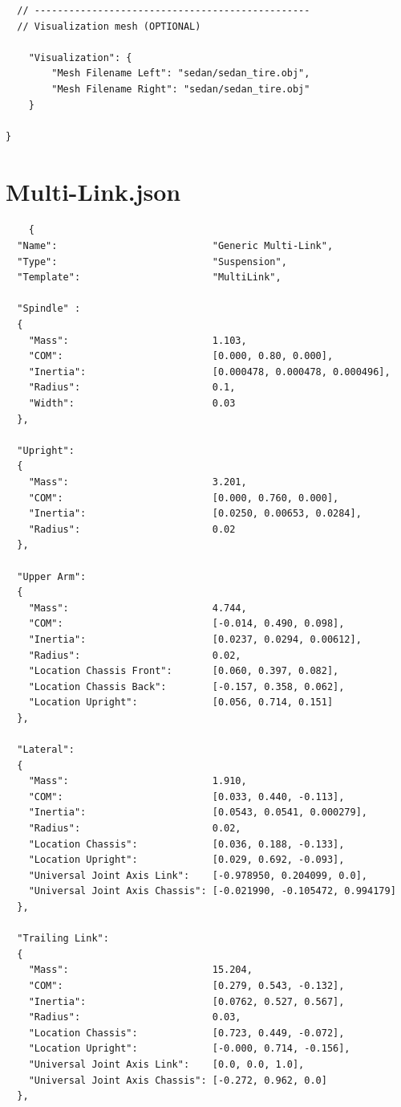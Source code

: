 \begin{lstlisting}
  // ------------------------------------------------
  // Visualization mesh (OPTIONAL)

    "Visualization": {
        "Mesh Filename Left": "sedan/sedan_tire.obj",
        "Mesh Filename Right": "sedan/sedan_tire.obj"
    }

}
\end{lstlisting}

\section{Multi-Link.json}
\begin{lstlisting}
    {
  "Name":                           "Generic Multi-Link",
  "Type":                           "Suspension",
  "Template":                       "MultiLink",

  "Spindle" :
  {
    "Mass":                         1.103,
    "COM":                          [0.000, 0.80, 0.000],
    "Inertia":                      [0.000478, 0.000478, 0.000496],
    "Radius":                       0.1,
    "Width":                        0.03
  },

  "Upright":
  {
    "Mass":                         3.201,
    "COM":                          [0.000, 0.760, 0.000],
    "Inertia":                      [0.0250, 0.00653, 0.0284],
    "Radius":                       0.02
  },

  "Upper Arm":
  {
    "Mass":                         4.744,
    "COM":                          [-0.014, 0.490, 0.098],
    "Inertia":                      [0.0237, 0.0294, 0.00612],
    "Radius":                       0.02,
    "Location Chassis Front":       [0.060, 0.397, 0.082],
    "Location Chassis Back":        [-0.157, 0.358, 0.062],
    "Location Upright":             [0.056, 0.714, 0.151]
  },

  "Lateral":
  {
    "Mass":                         1.910,
    "COM":                          [0.033, 0.440, -0.113],
    "Inertia":                      [0.0543, 0.0541, 0.000279],
    "Radius":                       0.02,
    "Location Chassis":             [0.036, 0.188, -0.133],
    "Location Upright":             [0.029, 0.692, -0.093],
    "Universal Joint Axis Link":    [-0.978950, 0.204099, 0.0],
    "Universal Joint Axis Chassis": [-0.021990, -0.105472, 0.994179]
  },

  "Trailing Link":
  {
    "Mass":                         15.204,
    "COM":                          [0.279, 0.543, -0.132],
    "Inertia":                      [0.0762, 0.527, 0.567],
    "Radius":                       0.03,
    "Location Chassis":             [0.723, 0.449, -0.072],
    "Location Upright":             [-0.000, 0.714, -0.156],
    "Universal Joint Axis Link":    [0.0, 0.0, 1.0],
    "Universal Joint Axis Chassis": [-0.272, 0.962, 0.0]
  },


\end{lstlisting}
